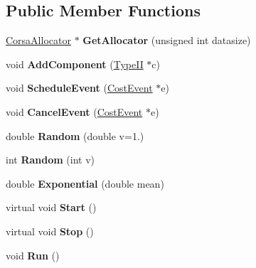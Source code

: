 \subsection*{Public Member Functions}
\begin{DoxyCompactItemize}
\item 
\mbox{\label{classCostSimEng_a6d42fb3dbbc7df03c8459a35ecfee169}} 
\hyperlink{classCorsaAllocator}{Corsa\+Allocator} $\ast$ {\bfseries Get\+Allocator} (unsigned int datasize)
\item 
\mbox{\label{classCostSimEng_ac288e315c9b81c4df432980ff44bd866}} 
void {\bfseries Add\+Component} (\hyperlink{classTypeII}{Type\+II} $\ast$c)
\item 
\mbox{\label{classCostSimEng_a38c4aabf44e65ddfdd959729ebcb4dcf}} 
void {\bfseries Schedule\+Event} (\hyperlink{structCostEvent}{Cost\+Event} $\ast$e)
\item 
\mbox{\label{classCostSimEng_a455377f81802c06e04e4dc391791b56e}} 
void {\bfseries Cancel\+Event} (\hyperlink{structCostEvent}{Cost\+Event} $\ast$e)
\item 
\mbox{\label{classCostSimEng_a6048a0a1cff49a4e2f7bfeca381e6723}} 
double {\bfseries Random} (double v=1.)
\item 
\mbox{\label{classCostSimEng_a127601c325d19488fdf0c581b768f7f2}} 
int {\bfseries Random} (int v)
\item 
\mbox{\label{classCostSimEng_acc1720c9cdb5febb82759e3548626f0c}} 
double {\bfseries Exponential} (double mean)
\item 
\mbox{\label{classCostSimEng_a99c79de92c4bd410b243c6e9245ebbdf}} 
virtual void {\bfseries Start} ()
\item 
\mbox{\label{classCostSimEng_af799df40b1a3bd7de06b31e4927d5b26}} 
virtual void {\bfseries Stop} ()
\item 
\mbox{\label{classCostSimEng_ae79fd3ec1d850a585d832ef41a0471e5}} 
void {\bfseries Run} ()
\item 

\end{DoxyCompactItemize}
